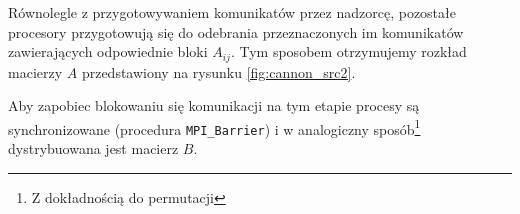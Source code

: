 Równolegle z przygotowywaniem komunikatów przez nadzorcę, pozostałe procesory przygotowują się do odebrania przeznaczonych im komunikatów zawierających odpowiednie bloki \(A_{ij}\). Tym sposobem otrzymujemy rozkład macierzy \(A\) przedstawiony na rysunku \ref{fig:cannon_src2}. 

Aby zapobiec blokowaniu się komunikacji na tym etapie procesy są synchronizowane (procedura \texttt{MPI_Barrier}) i w analogiczny sposób\footnote{Z dokładnością do permutacji} dystrybuowana jest macierz \(B\).




